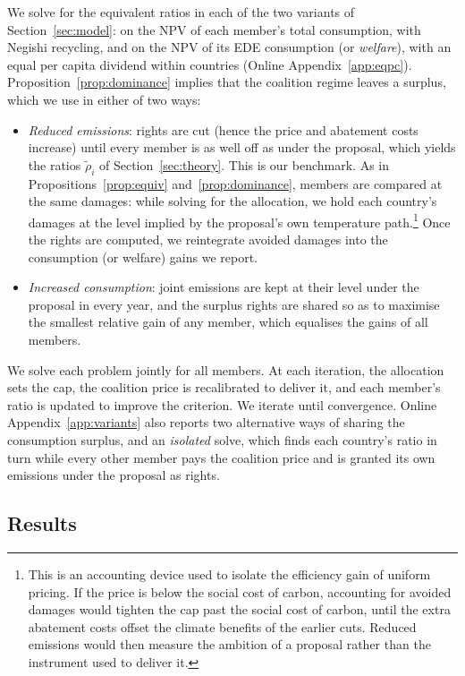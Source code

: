 \documentclass[12pt,english]{article}
\theoremstyle{remark}
\begin{document}
We solve for the equivalent ratios in each of the two variants of Section~\ref{sec:model}: on the NPV of each member's total consumption, with Negishi recycling, and on the NPV of its EDE consumption (or \textit{welfare}), with an equal per capita dividend within countries (Online Appendix~\ref{app:eqpc}). Proposition~\ref{prop:dominance} implies that the coalition regime leaves a surplus, which we use in either of two ways:
\begin{itemize}
  \item \emph{Reduced emissions}: rights are cut (hence the price and abatement costs increase) until every member is as well off as under the proposal, which yields the ratios $\tilde\rho_i$ of Section~\ref{sec:theory}. This is our benchmark.
  As in Propositions~\ref{prop:equiv} and~\ref{prop:dominance}, members are compared at the same damages: while solving for the allocation, we hold each country's damages at the level implied by the proposal's own temperature path.\footnote{This is an accounting device used to isolate the efficiency gain of uniform pricing. If the price is below the social cost of carbon, accounting for avoided damages would tighten the cap past the social cost of carbon, until the extra abatement costs offset the climate benefits of the earlier cuts.
  Reduced emissions would then measure the ambition of a proposal rather than the instrument used to deliver it.}
  Once the rights are computed, we reintegrate avoided damages into the consumption (or welfare) gains we report.
  \item \emph{Increased consumption}: joint emissions are kept at their level under the proposal in every year, and the surplus rights are shared so as to maximise the smallest relative gain of any member, which equalises the gains of all members.
\end{itemize}
We solve each problem jointly for all members. At each iteration, the allocation sets the cap, the coalition price is recalibrated to deliver it, and each member's ratio is updated to improve the criterion. We iterate until convergence.
Online Appendix~\ref{app:variants} also reports two alternative ways of sharing the consumption surplus, and an \emph{isolated} solve, which finds each country's ratio in turn while every other member pays the coalition price and is granted its own emissions under the proposal as rights.

\subsection{Results}
\end{document}
